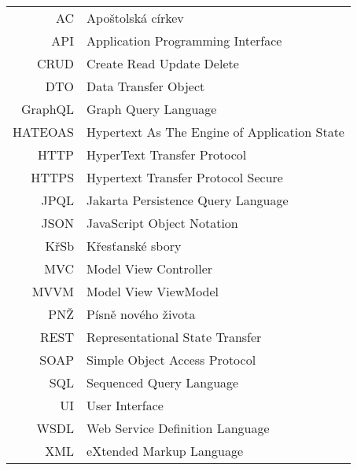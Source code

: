 \documentclass[czech,bachelor,unicode]{ctufit-thesis}
\begin{document}
\begin{tabular}{rl}
AC & Apoštolská církev\\
API & Application Programming Interface\\
CRUD & Create Read Update Delete\\
DTO & Data Transfer Object\\
GraphQL & Graph Query Language\\
HATEOAS & Hypertext As The Engine of Application State\\
HTTP & HyperText Transfer Protocol\\
HTTPS & Hypertext Transfer Protocol Secure\\
JPQL & Jakarta Persistence Query Language\\
JSON & JavaScript Object Notation\\
KřSb & Křesťanské sbory\\
MVC & Model View Controller\\
MVVM & Model View ViewModel\\
PNŽ & Písně nového života\\
REST & Representational State Transfer\\
SOAP & Simple Object Access Protocol\\
SQL & Sequenced Query Language\\
UI & User Interface\\
WSDL & Web Service Definition Language\\
XML & eXtended Markup Language\\
\end{tabular}


\mainmatter\mainmatterinit











\appendix\appendixinit

\backmatter

\printbibliography


\end{document}
